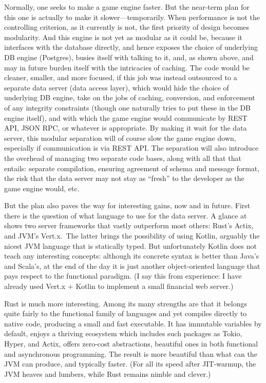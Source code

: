 Normally, one seeks to make a game engine faster.
But the near-term plan for this one is actually to make it slower---temporarily.
When performance is not the controlling criterion, as it currently is not,
the first priority of design becomes modularity.
And this engine is not yet as modular as it could be, because it interfaces
with the database directly, and hence exposes the choice of underlying DB
engine (Postgres), busies itself with talking to it,
and, as shown above, and may in future burden itself with the intricacies of
caching.
The code would be cleaner, smaller, and more focused, if this job was
instead outsourced to a separate data server (data access layer), which would
hide the choice
of underlying DB engine, take on the jobs of caching, conversion, and
enforcement of any integrity constraints (though one naturally tries to put
these in the DB engine itself), and with which the game engine would
communicate by REST API, JSON RPC, or whatever is appropriate.
By making it
wait for the data server, this modular separation will of course slow the game
engine down, especially if communication is via REST API. The separation will
also introduce the overhead of managing two separate code bases, along with all
that that entails: separate compilation, ensuring agreement of schema and
message format, the risk that the data server may not stay as ``fresh'' to the
developer as the game engine would, etc.

But the plan also paves the way for interesting gains, now and in future.
First there is the question of what language to use for the data server.
A glance at
 shows two
server frameworks that vastly outperform
most others: Rust's Actix, and JVM's Vert.x.\ The latter brings the possibility
of using Kotlin, arguably the nicest JVM language that is statically typed.
But unfortunately Kotlin does not teach any interesting concepts: although its
concrete syntax is better than Java's and Scala's, at the end of the day it is
just another object-oriented language that pays respect to the functional
paradigm. (I say this from experience: I have already used Vert.x + Kotlin to
implement a small financial web server.)

Rust is much more interesting.
Among its many strengths are that it belongs
quite fairly to the functional family of languages and yet compiles directly
to native code, producing a small and fast executable.
It has immutable
variables by default, enjoys a thriving ecosystem which includes such packages
as Tokio, Hyper, and Actix, offers zero-cost abstractions, beautiful ones in
both functional and asynchronous programming.
The result is more
beautiful than what can the JVM can produce, and typically faster. (For all its
speed after JIT-warmup, the JVM heaves and lumbers, while Rust remains nimble
and clever.)

